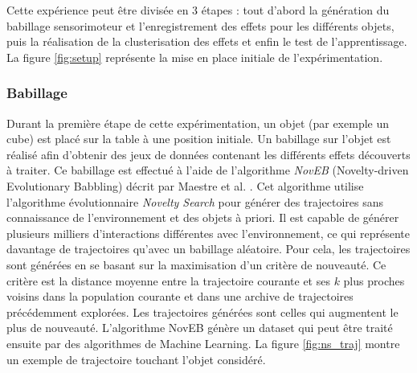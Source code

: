 \documentclass[draft]{llncs}
\begin{document}
Cette expérience peut être divisée en 3 étapes : tout d'abord la génération du babillage sensorimoteur et l'enregistrement des effets pour les différents objets, puis la réalisation de la clusterisation des effets et enfin le test de l'apprentissage.
La figure \ref{fig:setup} représente la mise en place initiale de l'expérimentation.



\subsubsection{Babillage}

Durant la première étape de cette expérimentation, un objet (par exemple un cube) est placé sur la table à une position initiale.
Un babillage sur l'objet est réalisé afin d'obtenir des jeux de données contenant les différents effets découverts à traiter.
Ce babillage est effectué à l'aide de l'algorithme \textit{NovEB} (Novelty-driven Evolutionary Babbling) décrit par Maestre et al. \cite{Maestre2015}.
Cet algorithme utilise l'algorithme évolutionnaire \textit{Novelty Search} \cite{5949955} pour générer des trajectoires sans connaissance de l'environnement et des objets à priori. 
Il est capable de générer plusieurs milliers d'interactions différentes avec l'environnement, ce qui représente davantage de trajectoires qu'avec un babillage aléatoire.
Pour cela, les trajectoires sont générées en se basant sur la maximisation d'un critère de nouveauté.
Ce critère est la distance moyenne entre la trajectoire courante et ses $k$ plus proches voisins dans la population courante et dans une archive de trajectoires précédemment explorées.
Les trajectoires générées sont celles qui augmentent le plus de nouveauté.
L'algorithme NovEB génère un dataset qui peut être traité ensuite par des algorithmes de Machine Learning.
La figure \ref{fig:ns_traj} montre un exemple de trajectoire touchant l'objet considéré.
\end{document}
